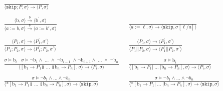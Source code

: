 \documentclass[times,10pt]{article}
\begin{document}
\begin{align*}
\frac{}{\langle \mathtt{skip}; P, \sigma \rangle \rightarrow \langle P, \sigma \rangle } & \\ \\
\frac{\langle \textrm{b}, \sigma \rangle \overset{b}{\rightarrow} \langle \textrm{b}^\prime, \sigma \rangle}{\langle a := b, \sigma\rangle \overset{b}{\rightarrow}  \langle a := b', \sigma \rangle} &\;\; 
\frac{}{\langle a := \ell, \sigma\rangle \rightarrow \langle \mathtt{skip}, \sigma[\ell/a] \rangle } \\ \\
\frac{\langle P_1, \sigma\rangle \rightarrow \langle P_1^\prime, \sigma^\prime\rangle }{\langle P_1; P_2, \sigma\rangle \rightarrow \langle P_1^\prime; P_2, \sigma^\prime\rangle} &
\;\; \frac{\langle P_1, \sigma\rangle \rightarrow \langle P_1^\prime, \sigma^\prime\rangle}{\langle P_1 || P_2, \sigma\rangle \rightarrow \langle P_1^\prime || P_2, \sigma^\prime\rangle} \\ \\
\frac{\sigma \models \textrm{b}_i \;\;\; \sigma \models \lnot \mathrm{b}_1 \wedge \; ... \; \wedge \; \lnot \mathrm{b}_{i-1} \; \wedge \lnot \mathrm{b}_{i+1} \wedge \; ... \; \wedge \; \lnot\mathrm{b}_n } {\langle [ \mathrm{b}_1 \rightarrow P_1  \talloblong \; ... \; \talloblong \mathrm{b}_n \rightarrow P_n ] , \sigma \rangle \rightarrow \langle P_i , \sigma\rangle  } &\;\;
 \frac{\sigma \models \textrm{b}_i} {\langle [ \mathrm{b}_1 \rightarrow P_1  | \; ... \; | \mathrm{b}_n \rightarrow P_n ] , \sigma \rangle \rightarrow \langle P_i , \sigma\rangle  } \\ \\
\frac{\sigma \models \lnot b_1 \wedge ... \wedge \lnot b_n}{\langle *[ \mathrm{b}_1 \rightarrow P_1  \talloblong \; ... \; \talloblong \mathrm{b}_n \rightarrow P_n ] , \sigma \rangle \rightarrow \langle \mathtt{skip} , \sigma\rangle } &\;\; 
\frac{\sigma \models \lnot b_1 \wedge ... \wedge \lnot b_n}{\langle *[ \mathrm{b}_1 \rightarrow P_1  | \; ... \; | \mathrm{b}_n \rightarrow P_n ] , \sigma \rangle \rightarrow \langle \mathtt{skip} , \sigma \rangle } 
\end{align*}
\end{document}

